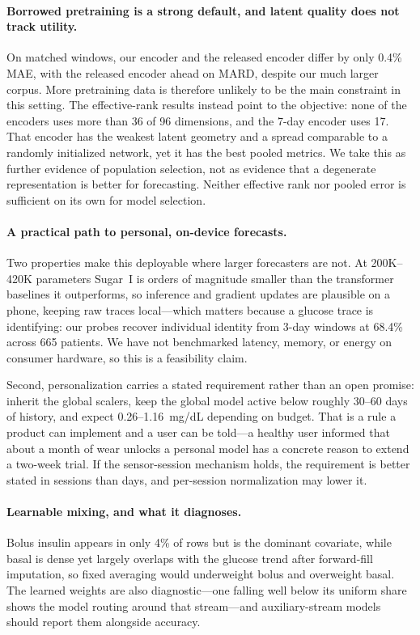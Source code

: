 \documentclass[11pt,a4paper]{article}
\begin{document}
\paragraph{Borrowed pretraining is a strong default, and latent quality does not track utility.}
On matched windows, our encoder and the released encoder differ by only 0.4\% MAE, with the released encoder ahead on MARD, despite our much larger corpus.
More pretraining data is therefore unlikely to be the main constraint in this setting.
The effective-rank results instead point to the objective: none of the encoders uses more than 36 of 96 dimensions, and the 7-day encoder uses 17.
That encoder has the weakest latent geometry and a spread comparable to a randomly initialized network, yet it has the best pooled metrics.
We take this as further evidence of population selection, not as evidence that a degenerate representation is better for forecasting.
Neither effective rank nor pooled error is sufficient on its own for model selection.

\paragraph{A practical path to personal, on-device forecasts.}
Two properties make this deployable where larger forecasters are not.
At 200K--420K parameters Sugar~I is orders of magnitude smaller than the transformer baselines it outperforms, so inference and gradient updates are plausible on a phone, keeping raw traces local---which matters because a glucose trace is identifying: our probes recover individual identity from 3-day windows at 68.4\% across 665 patients.
We have not benchmarked latency, memory, or energy on consumer hardware, so this is a feasibility claim.

Second, personalization carries a stated requirement rather than an open promise: inherit the global scalers, keep the global model active below roughly 30--60 days of history, and expect 0.26--1.16~mg/dL depending on budget.
That is a rule a product can implement and a user can be told---a healthy user informed that about a month of wear unlocks a personal model has a concrete reason to extend a two-week trial.
If the sensor-session mechanism holds, the requirement is better stated in sessions than days, and per-session normalization may lower it.

\paragraph{Learnable mixing, and what it diagnoses.}
Bolus insulin appears in only 4\% of rows but is the dominant covariate, while basal is dense yet largely overlaps with the glucose trend after forward-fill imputation, so fixed averaging would underweight bolus and overweight basal.
The learned weights are also diagnostic---one falling well below its uniform share shows the model routing around that stream---and auxiliary-stream models should report them alongside accuracy.
\end{document}
